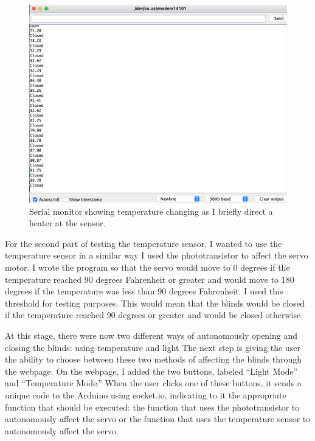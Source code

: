\documentclass[10pt,twocolumn]{article}
\begin{document}
\begin{figure}
    \centering
    \includegraphics[width=.95\linewidth]{Figure 5.png}
    \caption{
        Serial monitor showing temperature changing as I briefly direct a heater at the sensor. 
    }
    \label{fig:fig5}
\end{figure}

For the second part of testing the temperature sensor, I wanted to use the temperature sensor in a similar way I used the phototransistor to affect the servo motor. I wrote the program so that the servo would move to 0 degrees if the temperature reached 90 degrees Fahrenheit or greater and would move to 180 degrees if the temperature was less than 90 degrees Fahrenheit. I used this threshold for testing purposes. This would mean that the blinds would be closed if the temperature reached 90 degrees or greater and would be closed otherwise.

At this stage, there were now two different ways of autonomously opening and closing the blinds: using temperature and light The next step is giving the user the ability to choose between these two methods of affecting the blinds through the webpage. On the webpage, I added the two buttons, labeled “Light Mode'' and “Temperature Mode.” When the user clicks one of these buttons, it sends a unique code to the Arduino using socket.io, indicating to it the appropriate function that should be executed: the function that uses the phototransistor to autonomously affect the servo or the function that uses the temperature sensor to autonomously affect the servo. 
\end{document}
